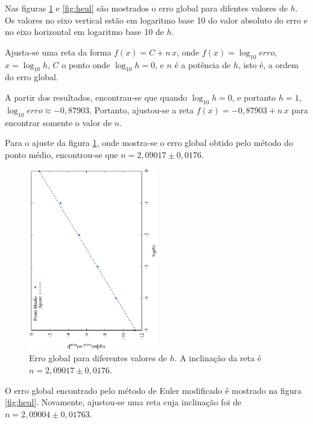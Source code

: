 \documentclass[brazilian, 12pt, a4paper, final]{article}
\begin{document}
Nas figuras \ref{fig:hmid} e \ref{fig:heul} são mostrados o erro global para difentes valores de $h$. Os valores no eixo vertical estão em logaritmo base 10 do valor absoluto do erro e no eixo horizontal em logaritmo base 10 de $h$.

Ajusta-se uma reta da forma $f(x)=C+n\,x$, onde $f(x)=\log _{10}erro$, $x=\log_{10}h$, $C$ o ponto onde $\log_{10}h=0$, e $n$ é a potência de $h$, isto é, a ordem do erro global.

A partir dos resultados, encontrau-se que quando $\log_{10}h=0$, e portanto $h=1$, $\log_{10}erro\approx-0,87903$. Portanto, ajustou-se a reta $f(x)=-0,87903 + n\,x$  para encontrar somente o valor de $n$.

Para o ajuste da figura \ref{fig:hmid}, onde mostra-se o erro global obtido pelo método do ponto médio, encontrou-se que $n=2,09017\pm0,0176$.

\begin{figure}[htbp]
  \centering
  \includegraphics[width=0.50\textwidth,angle=-90]{h_erros_mid.eps}
  \caption{Erro global para diferentes valores de $h$. A inclinação da reta é $n=2,09017\pm0,0176$.}
  \label{fig:hmid}
\end{figure}

O erro global encontrado pelo método de Euler modificado é mostrado na figura \ref{fig:heul}. Novamente, ajustou-se uma reta cuja inclinação foi de $n=2,09004\pm0,01763$.
\end{document}
